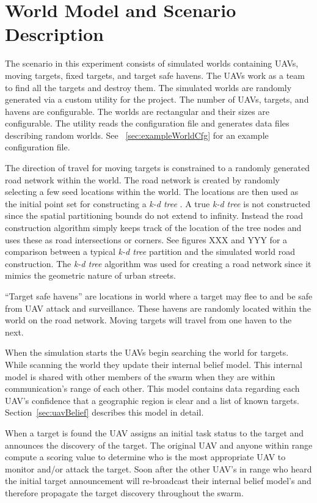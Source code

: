 \chapter{World Model and Scenario Description}

The scenario in this experiment consists of simulated worlds containing UAVs, moving targets, fixed targets, and target safe havens.  The UAVs work as a team to find all the targets and destroy them.  The simulated worlds are randomly generated via a custom utility for the project.  The number of UAVs, targets, and havens are configurable.  The worlds are rectangular and their sizes are configurable.  The utility reads the configuration file and generates data files describing random worlds.  See ~\ref{sec:exampleWorldCfg} for an example configuration file.

The direction of travel for moving targets is constrained to a randomly generated road network within the world.  The road network is created by randomly selecting a few seed locations within the world.  The locations are then used as the initial point set for constructing a \textit{k-d tree} .  A true \textit{k-d tree} is not constructed since the spatial partitioning bounds do not extend to infinity.  Instead the road construction algorithm simply keeps track of the location of the tree nodes and uses these as road intersections or corners.  See figures XXX and YYY  for a comparison between a typical \textit{k-d tree} partition and the simulated world road construction.  The \textit{k-d tree} algorithm was used for creating a road network since it mimics the geometric nature of urban streets. 



``Target safe havens'' are locations in world where a target may flee to and be safe from UAV attack and surveillance.  These havens are randomly located within the world on the road network.  Moving targets will travel from one haven to the next.

When the simulation starts the UAVs begin searching the world for targets.  While scanning the world they update their internal belief model.  This internal model is shared with other members of the swarm when they are within communication's range of each other.  This model contains data regarding each UAV's confidence that a geographic region is clear and a list of known targets.  Section~\ref{sec:uavBelief} describes this model in detail.

When a target is found the UAV assigns an initial task status to the target and announces the discovery of the target.  The original UAV and anyone within range compute a scoring value to determine who is the most appropriate UAV to monitor and/or attack the target.  Soon after the other UAV's in range who heard the initial target announcement will re-broadcast their internal belief model's and therefore propagate the target discovery throughout the swarm.

